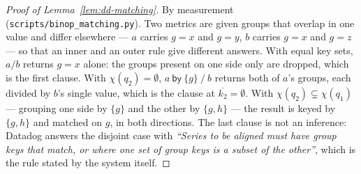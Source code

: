 \begin{proof}[Proof of Lemma~\ref{lem:dd-matching}]
By measurement (\texttt{scripts\slash binop\_matching.py}). Two metrics are given
groups that overlap in one value and differ elsewhere --- $a$ carries $g{=}x$ and
$g{=}y$, $b$ carries $g{=}x$ and $g{=}z$ --- so that an inner and an outer rule give
different answers. With equal key sets, $a/b$ returns $g{=}x$ alone: the groups present
on one side only are dropped, which is the first clause. With $\chi(q_2)=\emptyset$,
$a\ \mathsf{by}\ \{g\}\ /\ b$ returns both of $a$'s groups, each divided by $b$'s single
value, which is the clause at $\overline{k_2}=\emptyset$. With
$\chi(q_2)\subsetneq\chi(q_1)$ --- grouping one side by $\{g\}$ and the other by
$\{g,h\}$ --- the result is keyed by $\{g,h\}$ and matched on $g$, in both directions.
The last clause is not an inference: Datadog answers the disjoint case with
\emph{``Series to be aligned must have group keys that match, or where one set of group
keys is a subset of the other''}, which is the rule stated by the system itself.
\end{proof}
